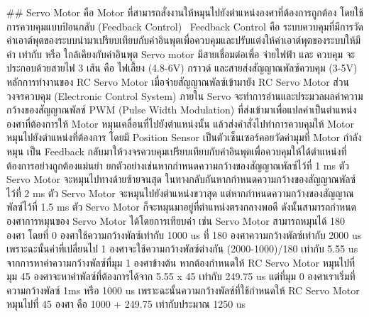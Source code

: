## Servo Motor 
    คือ Motor ที่สามารถสั่งงานให้หมุนไปยังตำแหน่งองศาที่ต้องการถูกต้อง โดยใช้การควบคุมแบบป้อนกลับ (Feedback Control)  Feedback Control คือ ระบบควบคุมที่มีการวัดค่าเอาต์พุตของระบบนำมาเปรียบเทียบกับค่าอินพุตเพื่อควบคุมและปรับแต่งให้ค่าเอาต์พุตของระบบให้มีค่า เท่ากับ หรือ ใกล้เคียงกับค่าอินพุต Servo motor มีสายเชื่อมต่อเพื่อ จ่ายไฟฟ้า และ ควบคุม จะประกอบด้วยสายไฟ 3 เส้น คือ ไฟเลี้ยง (4.8-6V) กราวด์ และสายส่งสัญญาณพัลซ์ควบคุม (3-5V) 
    หลักการทำงานของ RC Servo Motor เมื่อจ่ายสัญญาณพัลซ์เข้ามายัง RC Servo Motor ส่วนวงจรควบคุม (Electronic Control System) ภายใน Servo จะทำการอ่านและประมวลผลค่าความกว้างของสัญญาณพัลซ์ PWM (Pulse Width Modulation) ที่ส่งเข้ามาเพื่อแปลค่าเป็นตำแหน่งองศาที่ต้องการให้ Motor หมุนเคลื่อนที่ไปยังตำแหน่งนั้น แล้วส่งคำสั่งไปทำการควบคุมให้ Motor หมุนไปยังตำแหน่งที่ต้องการ โดยมี Position Sensor เป็นตัวเซ็นเซอร์คอยวัดค่ามุมที่ Motor กำลังหมุน เป็น Feedback กลับมาให้วงจรควบคุมเปรียบเทียบกับค่าอินพุตเพื่อควบคุมให้ได้ตำแหน่งที่ต้องการอย่างถูกต้องแม่นยำ
    ยกตัวอย่างเช่นหากกำหนดความกว้างของสัญญาณพัลซ์ไว้ที่ 1 ms ตัว Servo Motor จะหมุนไปทางด้ายซ้ายจนสุด ในทางกลับกันหากกำหนดความกว้างของสัญญาณพัลซ์ไว้ที่ 2 ms ตัว Servo Motor จะหมุนไปยังตำแหน่งขวาสุด แต่หากกำหนดความกว้างของสัญญาณพัลซ์ไว้ที่ 1.5 ms ตัว Servo Motor ก็จะหมุนมาอยู่ที่ตำแหน่งตรงกลางพอดี ดังนั้นสามารถกำหนดองศาการหมุนของ Servo Motor ได้โดยการเทียบค่า เช่น Servo Motor สามารถหมุนได้ 180 องศา โดยที่ 0 องศาใช้ความกว้างพัลซ์เท่ากับ 1000 us ที่ 180 องศาความกว้างพัลซ์เท่ากับ 2000 us เพราะฉะนั้นค่าที่เปลี่ยนไป 1 องศาจะใช้ความกว้างพัลซ์ต่างกัน (2000-1000)/180 เท่ากับ 5.55 us 
    จากการหาค่าความกว้างพัลซ์ที่มุม 1 องศาข้างต้น หากต้องกำหนดให้ RC Servo Motor หมุนไปที่มุม 45 องศาจะหาค่าพัลซ์ที่ต้องการได้จาก 5.55 x 45 เท่ากับ 249.75 us แต่ที่มุม 0 องศาเราเริ่มที่ความกว้างพัลซ์ 1ms หรือ 1000 us เพราะฉะนั้นความกว้างพัลซ์ที่ใช้กำหนดให้ RC Servo Motor หมุนไปที่ 45 องศา คือ 1000 + 249.75 เท่ากับประมาณ 1250 us
